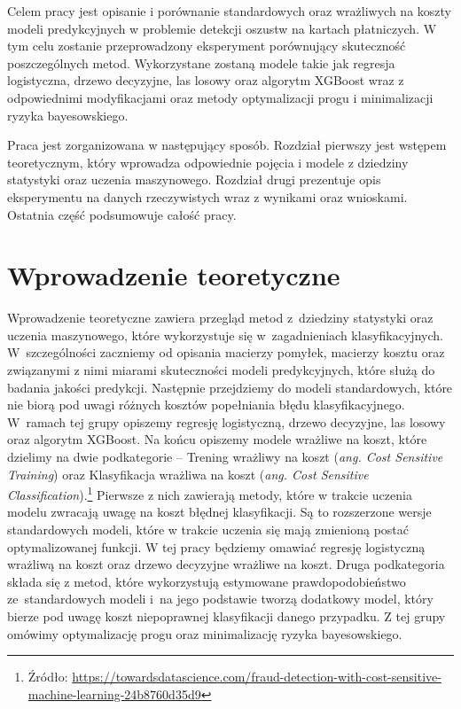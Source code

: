 \documentclass[inzynierska]{pwr_wmat_praca_dyplomowa}
\theoremstyle{plain}
\numberwithin{theorem}{chapter}
\theoremstyle{definition}
\numberwithin{theorem}{chapter}
\begin{document}
Celem pracy jest opisanie i porównanie standardowych oraz wrażliwych na koszty modeli predykcyjnych w problemie detekcji oszustw na kartach płatniczych. W tym celu zostanie przeprowadzony eksperyment porównujący skuteczność poszczególnych metod. Wykorzystane zostaną modele takie jak regresja logistyczna, drzewo decyzyjne, las losowy oraz algorytm XGBoost wraz z odpowiednimi modyfikacjami oraz metody optymalizacji progu i minimalizacji ryzyka bayesowskiego.

Praca jest zorganizowana w następujący sposób. Rozdział pierwszy jest wstępem teoretycznym, który wprowadza odpowiednie pojęcia i modele z dziedziny statystyki oraz uczenia maszynowego. Rozdział drugi prezentuje opis eksperymentu na danych rzeczywistych wraz z wynikami oraz wnioskami. Ostatnia część podsumowuje całość pracy.

\chapter{Wprowadzenie teoretyczne}

Wprowadzenie teoretyczne zawiera przegląd metod z~dziedziny statystyki oraz uczenia maszynowego, które wykorzystuje się w~zagadnieniach klasyfikacyjnych. W~szczególności zaczniemy od opisania macierzy pomyłek, macierzy kosztu oraz związanymi z nimi miarami skuteczności modeli predykcyjnych, które służą do badania jakości predykcji. Następnie przejdziemy do modeli standardowych, które nie biorą pod uwagi różnych kosztów popełniania błędu klasyfikacyjnego. W~ramach tej grupy opiszemy regresję logistyczną, drzewo decyzyjne, las losowy oraz algorytm XGBoost. Na końcu opiszemy modele wrażliwe na koszt, które dzielimy na dwie podkategorie -- Trening wrażliwy na koszt (\textit{ang. Cost Sensitive Training}) oraz Klasyfikacja wrażliwa na koszt (\textit{ang. Cost Sensitive Classification}).\footnote{Źródło:  \url{https://towardsdatascience.com/fraud-detection-with-cost-sensitive-machine-learning-24b8760d35d9}} Pierwsze z nich zawierają metody, które w trakcie uczenia modelu zwracają uwagę na koszt błędnej klasyfikacji. Są to rozszerzone wersje standardowych modeli, które w trakcie uczenia się mają zmienioną postać optymalizowanej funkcji. W tej pracy będziemy omawiać regresję logistyczną wrażliwą na koszt oraz drzewo decyzyjne wrażliwe na koszt. Druga podkategoria składa się z metod, które wykorzystują estymowane prawdopodobieństwo ze~standardowych modeli i~na jego podstawie tworzą dodatkowy model, który bierze pod uwagę koszt niepoprawnej klasyfikacji danego przypadku. Z tej grupy omówimy optymalizację progu oraz minimalizację ryzyka bayesowskiego.
\end{document}
